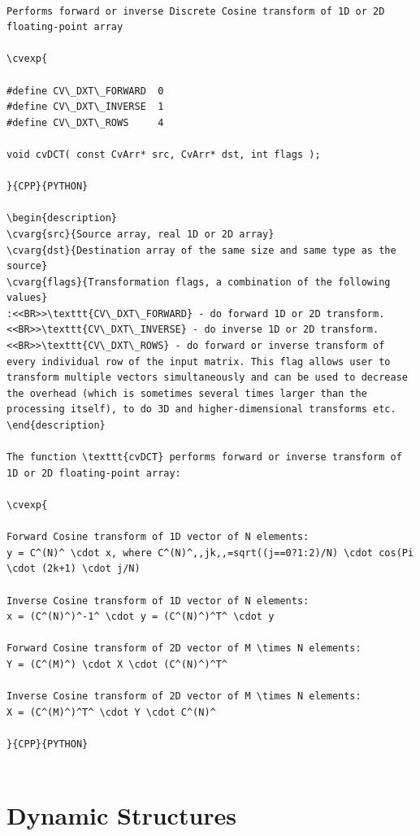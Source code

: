 \begin{verbatim}

Performs forward or inverse Discrete Cosine transform of 1D or 2D floating-point array

\cvexp{

#define CV\_DXT\_FORWARD  0
#define CV\_DXT\_INVERSE  1
#define CV\_DXT\_ROWS     4

void cvDCT( const CvArr* src, CvArr* dst, int flags );

}{CPP}{PYTHON}

\begin{description}
\cvarg{src}{Source array, real 1D or 2D array}
\cvarg{dst}{Destination array of the same size and same type as the source}
\cvarg{flags}{Transformation flags, a combination of the following values}
:<<BR>>\texttt{CV\_DXT\_FORWARD} - do forward 1D or 2D transform.<<BR>>\texttt{CV\_DXT\_INVERSE} - do inverse 1D or 2D transform.<<BR>>\texttt{CV\_DXT\_ROWS} - do forward or inverse transform of every individual row of the input matrix. This flag allows user to transform multiple vectors simultaneously and can be used to decrease the overhead (which is sometimes several times larger than the processing itself), to do 3D and higher-dimensional transforms etc.
\end{description}

The function \texttt{cvDCT} performs forward or inverse transform of 1D or 2D floating-point array:

\cvexp{

Forward Cosine transform of 1D vector of N elements:
y = C^(N)^ \cdot x, where C^(N)^,,jk,,=sqrt((j==0?1:2)/N) \cdot cos(Pi \cdot (2k+1) \cdot j/N)

Inverse Cosine transform of 1D vector of N elements:
x = (C^(N)^)^-1^ \cdot y = (C^(N)^)^T^ \cdot y

Forward Cosine transform of 2D vector of M \times N elements:
Y = (C^(M)^) \cdot X \cdot (C^(N)^)^T^

Inverse Cosine transform of 2D vector of M \times N elements:
X = (C^(M)^)^T^ \cdot Y \cdot C^(N)^

}{CPP}{PYTHON}


\end{verbatim}
\section{Dynamic Structures}
\begin{verbatim}


\end{verbatim}
